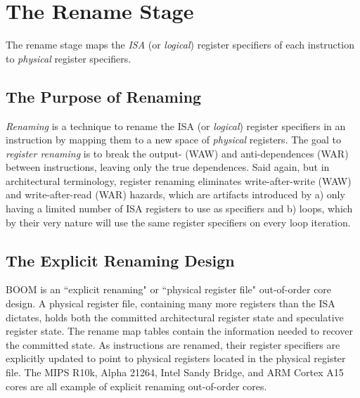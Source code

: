 \chapter{The Rename Stage}

The rename stage maps the {\em ISA} (or {\em logical}) register specifiers of each instruction to {\em physical} register specifiers. 


\section{The Purpose of Renaming}

{\em Renaming} is a technique to rename the ISA (or {\em logical}) register specifiers in an instruction by mapping them to a new space of {\em physical} registers.  The goal to {\em register renaming} is to break the output- (WAW) and anti-dependences (WAR) between instructions, leaving only the true dependences.  Said again, but in architectural terminology, register renaming eliminates write-after-write (WAW) and write-after-read (WAR) hazards, which are artifacts introduced by a) only having a limited number of ISA registers to use as specifiers and b) loops, which by their very nature will use the same register specifiers on every loop iteration. 

\section{The Explicit Renaming Design}

BOOM is an ``explicit renaming" or ``physical register file" out-of-order core design.  A physical register file, containing many more registers than the ISA dictates, holds both the committed architectural register state and speculative register state. The rename map tables contain the information needed to recover the committed state. As instructions are renamed, their register specifiers are explicitly updated to point to physical registers located in the physical register file. The MIPS R10k, Alpha 21264, Intel Sandy Bridge, and ARM Cortex A15 cores are all example of explicit renaming out-of-order cores. 


